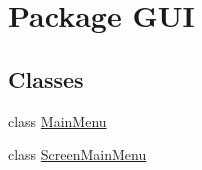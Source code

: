 \hypertarget{namespace_g_u_i}{\section{Package G\+U\+I}
\label{namespace_g_u_i}
}
\subsection*{Classes}
\begin{DoxyCompactItemize}
\item 
class \hyperlink{class_g_u_i_1_1_main_menu}{Main\+Menu}
\item 
class \hyperlink{class_g_u_i_1_1_screen_main_menu}{Screen\+Main\+Menu}
\end{DoxyCompactItemize}
